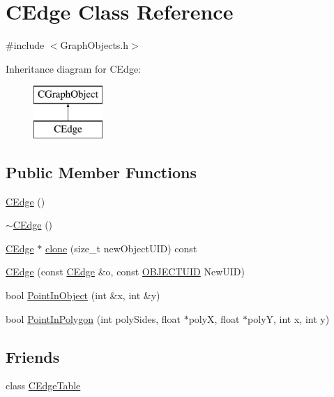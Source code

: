\hypertarget{class_c_edge}{}\section{C\+Edge Class Reference}
\label{class_c_edge}


{\ttfamily \#include $<$Graph\+Objects.\+h$>$}

Inheritance diagram for C\+Edge\+:\begin{figure}[H]
\begin{center}
\leavevmode
\includegraphics[height=2.000000cm]{class_c_edge}
\end{center}
\end{figure}
\subsection*{Public Member Functions}
\begin{DoxyCompactItemize}
\item 
\hyperlink{class_c_edge_a048d8d470cab9ecc8b1ef3b89af556aa}{C\+Edge} ()
\item 
\hyperlink{class_c_edge_a842f1c37249ca1d57c4a3e3d58cb286b}{$\sim$\+C\+Edge} ()
\item 
\hyperlink{class_c_edge}{C\+Edge} $\ast$ \hyperlink{class_c_edge_a82567d9c96ccb26d916b9932d34fc93f}{clone} (size\+\_\+t new\+Object\+U\+I\+D) const 
\item 
\hyperlink{class_c_edge_a4a5af9da59d305008a8d9be8747fbfeb}{C\+Edge} (const \hyperlink{class_c_edge}{C\+Edge} \&o, const \hyperlink{_object_database_defines_8h_a164ec120b01429b93c9cd0bef2a67e64}{O\+B\+J\+E\+C\+T\+U\+I\+D} New\+U\+I\+D)
\item 
bool \hyperlink{class_c_edge_a31f695fca55a3776eeec9df2bea6edc9}{Point\+In\+Object} (int \&x, int \&y)
\item 
bool \hyperlink{class_c_edge_a729f21acbf2541677491c31a23364f86}{Point\+In\+Polygon} (int poly\+Sides, float $\ast$poly\+X, float $\ast$poly\+Y, int x, int y)
\end{DoxyCompactItemize}
\subsection*{Friends}
\begin{DoxyCompactItemize}
\item 
class \hyperlink{class_c_edge_afb64c52eb3833710d8b813698ec97179}{C\+Edge\+Table}
\end{DoxyCompactItemize}
